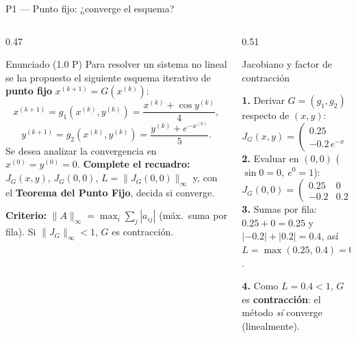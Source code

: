 \documentclass[aspectratio=169,10pt]{beamer}
\begin{document}
\begin{frame}{P1 — Punto fijo: ¿converge el esquema?}
\begin{columns}[T]
\begin{column}{0.47\textwidth}
\begin{cardidea}{Enunciado \textmd{\small(1.0 P)}}{\faQuestionCircle}
{\footnotesize Para resolver un sistema no lineal se ha propuesto el siguiente esquema iterativo de \textbf{punto fijo} $x^{(k+1)}=G(x^{(k)})$:
\[
x^{(k+1)}=g_1(x^{(k)},y^{(k)})=\frac{x^{(k)}+\cos y^{(k)}}{4},
\]
\[
y^{(k+1)}=g_2(x^{(k)},y^{(k)})=\frac{y^{(k)}+e^{-x^{(k)}}}{5}.
\]
Se desea analizar la convergencia en $x^{(0)}=y^{(0)}=0$. \textbf{Complete el recuadro:} $J_G(x,y)$, $J_G(0,0)$, $L=\lVert J_G(0,0)\rVert_\infty$ y, con el \textbf{Teorema del Punto Fijo}, decida si converge.}
\end{cardidea}
\vspace{1mm}
\begin{cardnota}[\faInfoCircle]
{\footnotesize \textbf{Criterio:} $\lVert A\rVert_\infty=\max_i\sum_j|a_{ij}|$ (máx.\ suma por fila). Si $\lVert J_G\rVert_\infty<1$, $G$ es contracción.}
\end{cardnota}
\end{column}
\begin{column}{0.51\textwidth}
\begin{cardgear}{Jacobiano y factor de contracción}{\faCogs}
{\scriptsize
\textbf{1.} Derivar $G=(g_1,g_2)$ respecto de $(x,y)$:
\[
J_G(x,y)=\begin{pmatrix} 0.25 & -0.25\sin y\\ -0.2\,e^{-x} & 0.2 \end{pmatrix}.
\]
\textbf{2.} Evaluar en $(0,0)$ ($\sin 0=0,\ e^{0}=1$):
\[
J_G(0,0)=\begin{pmatrix} 0.25 & 0\\ -0.2 & 0.2 \end{pmatrix}.
\]
\textbf{3.} Sumas por fila: $0.25+0=0.25$ y $|{-}0.2|+|0.2|=0.4$, así $L=\max(0.25,\,0.4)=0.4$.

\smallskip
\textbf{4.} Como $L=0.4<1$, $G$ es \textbf{contracción}: el método \emph{sí} converge (linealmente).}
\end{cardgear}
\end{column}
\end{columns}
\end{frame}
\end{document}
